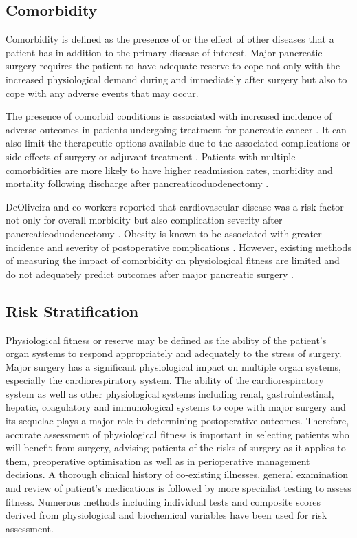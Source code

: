 \subsection{Comorbidity}
Comorbidity is defined as the presence of or the effect of other diseases that a patient has in addition to the primary disease of interest. 
Major pancreatic surgery requires the patient to have adequate reserve to cope not only with the increased physiological demand during and immediately after surgery but also to cope with any adverse events that may occur.

The presence of comorbid conditions is associated with increased incidence of adverse outcomes in patients undergoing treatment for pancreatic cancer \parencite{mann_review_2010}. 
It can also limit the therapeutic options available due to the associated complications or side effects of surgery or adjuvant treatment \parencite{sandroussi_sociodemographics_2010}. 
Patients with multiple comorbidities are more likely to have higher readmission rates, morbidity and mortality following discharge after pancreaticoduodenectomy \parencite{teh_patient_2009}. 

DeOliveira and co-workers reported that cardiovascular disease was a risk factor not only for overall morbidity but also complication severity after pancreaticoduodenectomy \parencite{deoliveira_assessment_2006}. 
Obesity is known to be associated with greater incidence and severity of postoperative complications \parencite{benns_impact_2009}. 
However, existing methods of measuring the impact of comorbidity on physiological fitness are limited and do not adequately predict outcomes after major pancreatic surgery \parencite{de_castro_evaluation_2009}. 

\subsection{Risk Stratification}
Physiological fitness or reserve may be defined as the ability of the patient's organ systems to respond appropriately and adequately to the stress of surgery. 
Major surgery has a significant physiological impact on multiple organ systems, especially the cardiorespiratory system. 
The ability of the cardiorespiratory system as well as other physiological systems including renal, gastrointestinal, hepatic, coagulatory and immunological systems to cope with major surgery and its sequelae plays a major role in determining postoperative outcomes. 
Therefore, accurate assessment of physiological fitness is important in selecting patients who will benefit from surgery, advising patients of the risks of surgery as it applies to them, preoperative optimisation as well as in perioperative management decisions. 
A thorough clinical history of co-existing illnesses, general examination and review of patient's medications is followed by more specialist testing to assess fitness. 
Numerous methods including individual tests and composite scores derived from physiological and biochemical variables have been used for risk assessment.

